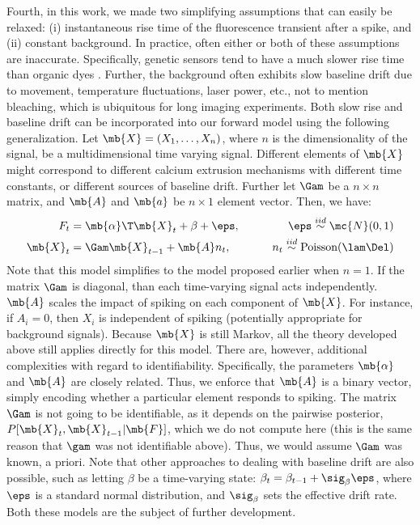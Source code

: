 Fourth, in this work, we made two simplifying assumptions that can easily be relaxed: (i) instantaneous rise time of the fluorescence transient after a spike, and (ii) constant background.  In practice, often either or both of these assumptions are inaccurate.  Specifically, genetic sensors tend to have a much slower rise time than organic dyes \cite{ReiffBorst05}.  Further, the background often exhibits slow baseline drift due to movement, temperature fluctuations, laser power, etc., not to mention bleaching, which is ubiquitous for long imaging experiments.  Both slow rise and baseline drift can be incorporated into our forward model using the following generalization. Let $\mb{X}=(X_1, \ldots, X_n)$, where $n$ is the dimensionality of the signal, be a multidimensional time varying signal.  Different elements of $\mb{X}$ might correspond to different calcium extrusion mechanisms with different time constants, or different sources of baseline drift.  Further let $\Gam$ be a $n \times n$ matrix, and $\mb{A}$ and $\mb{a}$ be $n \times 1$ element vector.  Then, we have:
\begin{align}
	F_t &= \mb{\alpha}\T \mb{X}_t + \beta + \eps, \qquad& \eps \overset{iid}{\sim} \mc{N}(0,1) \\
	\mb{X}_t &= \Gam \mb{X}_{t-1} + \mb{A} n_t, & n_t \overset{iid}{\sim} \text{Poisson}(\lam\Del)
\end{align}
Note that this model simplifies to the model proposed earlier when $n=1$.  If the matrix $\Gam$ is diagonal, than each time-varying signal acts independently.  $\mb{A}$ scales the impact of spiking on each component of $\mb{X}$.  For instance, if $A_i=0$, then $X_i$ is independent of spiking (potentially appropriate for background signals).  Because $\mb{X}$ is still Markov, all the theory developed above still applies directly for this model.  There are, however, additional complexities with regard to identifiability.  Specifically, the parameters $\mb{\alpha}$ and $\mb{A}$ are closely related.  Thus, we enforce that $\mb{A}$ is a binary vector, simply encoding whether a particular element responds to spiking.  The matrix $\Gam$ is not going to be identifiable, as it depends on the pairwise posterior, $P[\mb{X}_t, \mb{X}_{t-1} | \mb{F}]$, which we do not compute here (this is the same reason that $\gam$ was not identifiable above).  Thus,  we would assume $\Gam$ was known, a priori.  Note that other approaches to dealing with baseline drift are also possible, such as letting $\beta$ be a time-varying state: $\beta_t = \beta_{t-1} + \sig_\beta \eps$, where $\eps$ is a standard normal distribution, and $\sig_\beta$ sets the effective drift rate.  Both these models are the subject of further development.  



